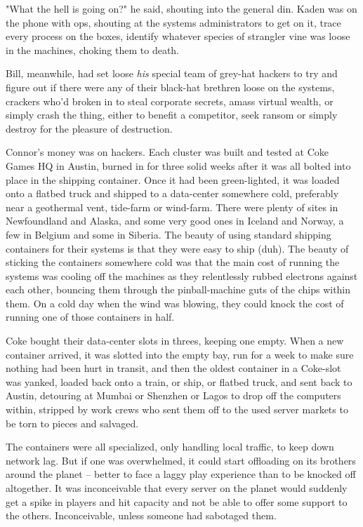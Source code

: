 "What the hell is going on?" he said, shouting into the general
din. Kaden was on the phone with ops, shouting at the systems
administrators to get on it, trace every process on the boxes,
identify whatever species of strangler vine was loose in the
machines, choking them to death.

Bill, meanwhile, had set loose \emph{his} special team of grey-hat
hackers to try and figure out if there were any of their black-hat
brethren loose on the systems, crackers who'd broken in to steal
corporate secrets, amass virtual wealth, or simply crash the thing,
either to benefit a competitor, seek ransom or simply destroy for
the pleasure of destruction.

Connor's money was on hackers. Each cluster was built and tested at
Coke Games HQ in Austin, burned in for three solid weeks after it
was all bolted into place in the shipping container. Once it had
been green-lighted, it was loaded onto a flatbed truck and shipped
to a data-center somewhere cold, preferably near a geothermal vent,
tide-farm or wind-farm. There were plenty of sites in Newfoundland
and Alaska, and some very good ones in Iceland and Norway, a few in
Belgium and some in Siberia. The beauty of using standard shipping
containers for their systems is that they were easy to ship (duh).
The beauty of sticking the containers somewhere cold was that the
main cost of running the systems was cooling off the machines as
they relentlessly rubbed electrons against each other, bouncing
them through the pinball-machine guts of the chips within them. On
a cold day when the wind was blowing, they could knock the cost of
running one of those containers in half.

Coke bought their data-center slots in threes, keeping one empty.
When a new container arrived, it was slotted into the empty bay,
run for a week to make sure nothing had been hurt in transit, and
then the oldest container in a Coke-slot was yanked, loaded back
onto a train, or ship, or flatbed truck, and sent back to Austin,
detouring at Mumbai or Shenzhen or Lagos to drop off the computers
within, stripped by work crews who sent them off to the used server
markets to be torn to pieces and salvaged.

The containers were all specialized, only handling local traffic,
to keep down network lag. But if one was overwhelmed, it could
start offloading on its brothers around the planet -- better to
face a laggy play experience than to be knocked off altogether. It
was inconceivable that every server on the planet would suddenly
get a spike in players and hit capacity and not be able to offer
some support to the others. Inconceivable, unless someone had
sabotaged them.

